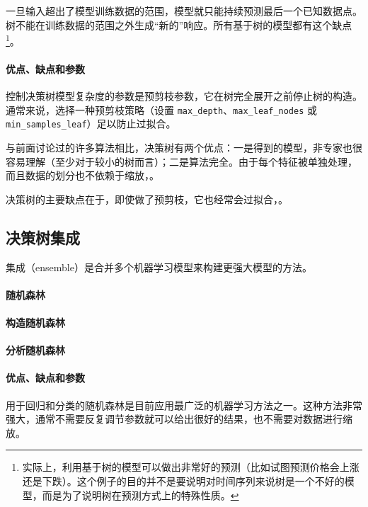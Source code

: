 
一旦输入超出了模型训练数据的范围，模型就只能持续预测最后一个已知数据点。树不能在训练数据的范围之外生成“新的”响应。所有基于树的模型都有这个缺点\footnote{实际上，利用基于树的模型可以做出非常好的预测（比如试图预测价格会上涨还是下跌）。这个例子的目的并不是要说明对时间序列来说树是一个不好的模型，而是为了说明树在预测方式上的特殊性质。}。

\paragraph{优点、缺点和参数} 控制决策树模型复杂度的参数是预剪枝参数，它在树完全展开之前停止树的构造。通常来说，选择一种预剪枝策略（设置 \verb|max_depth|、\verb|max_leaf_nodes| 或 \verb|min_samples_leaf|）足以防止过拟合。

与前面讨论过的许多算法相比，决策树有两个优点：一是得到的模型，非专家也很容易理解（至少对于较小的树而言）；二是算法完全。由于每个特征被单独处理，而且数据的划分也不依赖于缩放，。

决策树的主要缺点在于，即使做了预剪枝，它也经常会过拟合，。

\subsection{决策树集成}
集成（ensemble）是合并多个机器学习模型来构建更强大模型的方法。
\paragraph{随机森林}
\paragraph{构造随机森林}
\paragraph{分析随机森林}
\paragraph{优点、缺点和参数} 用于回归和分类的随机森林是目前应用最广泛的机器学习方法之一。这种方法非常强大，通常不需要反复调节参数就可以给出很好的结果，也不需要对数据进行缩放。

